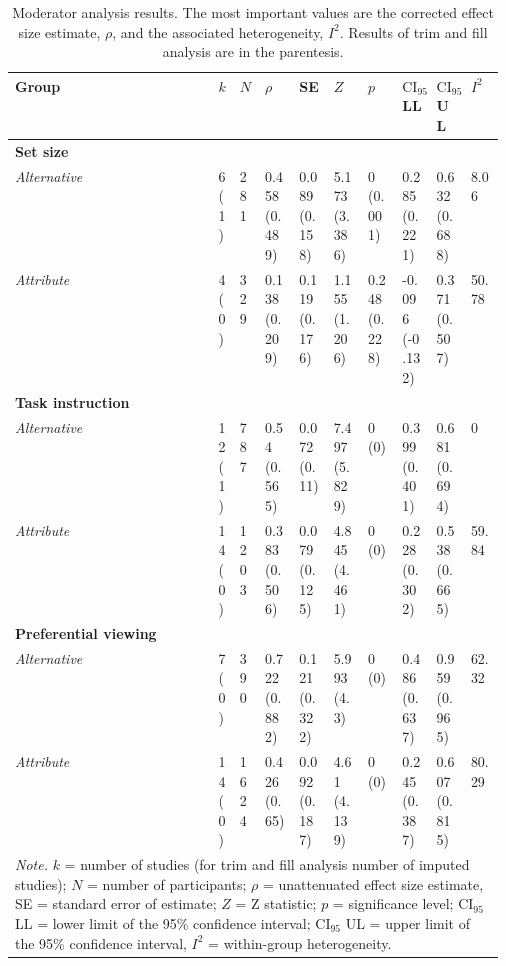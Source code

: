 \begin{table}[ht]
\centering
\caption{Moderator analysis results. The most important values are the corrected effect size estimate, $\rho$, and the associated heterogeneity, $I^2$. Results of trim and fill analysis are in the parentesis.} 
\label{tab:mod_results}
\begingroup\small
\begin{tabular}{lp{0.03\linewidth}p{0.05\linewidth}p{0.07\linewidth}p{0.07\linewidth}p{0.07\linewidth}p{0.07\linewidth}p{0.07\linewidth}p{0.07\linewidth}p{0.07\linewidth}}
  \hline
Group & $k$ & $N$ & $\rho$ & SE & $Z$ & $p$ & $\textrm{CI}_{95}$ LL & $\textrm{CI}_{95}$ UL & $I^2$ \\ 
  \hline
\textbf{Set size} &  &  &  &  &  &  &  &  &  \\ 
  \hspace{2mm}\textit{Alternative} & 6 (1) & 281 & 0.458 (0.489) & 0.089 (0.158) & 5.173 (3.386) & 0 (0.001) & 0.285 (0.221) & 0.632 (0.688) & 8.06 \\ 
  \hspace{2mm}\textit{Attribute} & 4 (0) & 329 & 0.138 (0.209) & 0.119 (0.176) & 1.155 (1.206) & 0.248 (0.228) & -0.096 (-0.132) & 0.371 (0.507) & 50.78 \\ 
  \textbf{Task instruction} &  &  &  &  &  &  &  &  &  \\ 
  \hspace{2mm}\textit{Alternative} & 12 (1) & 787 & 0.54 (0.565) & 0.072 (0.11) & 7.497 (5.829) & 0 (0) & 0.399 (0.401) & 0.681 (0.694) & 0 \\ 
  \hspace{2mm}\textit{Attribute} & 14 (0) & 1203 & 0.383 (0.506) & 0.079 (0.125) & 4.845 (4.461) & 0 (0) & 0.228 (0.302) & 0.538 (0.665) & 59.84 \\ 
  \textbf{Preferential viewing} &  &  &  &  &  &  &  &  &  \\ 
  \hspace{2mm}\textit{Alternative} & 7 (0) & 390 & 0.722 (0.882) & 0.121 (0.322) & 5.993 (4.3) & 0 (0) & 0.486 (0.637) & 0.959 (0.965) & 62.32 \\ 
  \hspace{2mm}\textit{Attribute} & 14 (0) & 1624 & 0.426 (0.65) & 0.092 (0.187) & 4.61 (4.139) & 0 (0) & 0.245 (0.387) & 0.607 (0.815) & 80.29 \\ 
   \hline 
 \multicolumn{10}{p{0.9\textwidth}}{\scriptsize{\textit{Note.} $k$ = number of studies (for trim and fill analysis number of imputed studies); $N$ = number of participants; $\rho$ = unattenuated effect size estimate, SE = standard error of estimate; $Z$ = Z statistic; $p$ = significance level; $\textrm{CI}_{95}$ LL = lower limit of the 95\% confidence interval; $\textrm{CI}_{95}$ UL = upper limit of the 95\% confidence interval, $I^2$ = within-group heterogeneity.}} 
\end{tabular}
\endgroup
\end{table}
